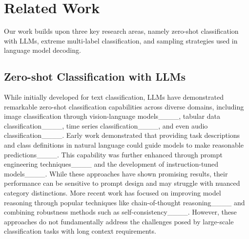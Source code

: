 \section{Related Work}
\label{sec:related_work}
Our work builds upon three key research areas, namely zero-shot classification with LLMs, extreme multi-label classification, and sampling strategies used in language model decoding.

\subsection{Zero-shot Classification with LLMs}
While initially developed for text classification, LLMs have demonstrated remarkable zero-shot classification capabilities across diverse domains, including image classification through vision-language models____, tabular data classification____, time series classification____, and even audio classification____. Early work demonstrated that providing task descriptions and class definitions in natural language could guide models to make reasonable predictions____. This capability was further enhanced through prompt engineering techniques____ and the development of instruction-tuned models____. While these approaches have shown promising results, their performance can be sensitive to prompt design and may struggle with nuanced category distinctions. More recent work has focused on improving model reasoning through popular techniques like chain-of-thought reasoning____ and combining robustness methods such as self-consistency____. However, these approaches do not fundamentally address the challenges posed by large-scale classification tasks with long context requirements.

